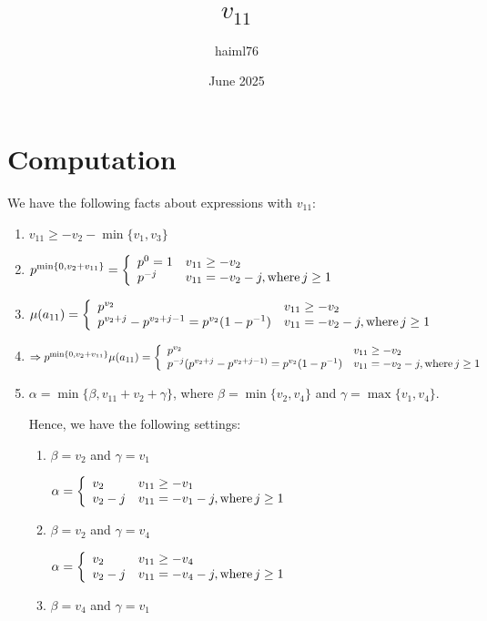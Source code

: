 \documentclass{article}
\title{$v_{11}$}
\author{haiml76 }
\date{June 2025}
\begin{document}
\maketitle

\section{Computation}
We have the following facts about expressions with $v_{11}$:
\begin{enumerate}
    \item 
$v_{11}\geq{-v_2-\min\{v_1,v_3\}}$
\item $p^{\min\{0,v_2+v_{11}\}}=\left\{
	\begin{array}{ll}
		p^{0}=1  & v_{11}\geq{-v_2} \\
		  p^{-j} & v_{11}=-v_2-j, \text{where\,}j\geq{1}
	\end{array}
\right.$
\item $\mu(a_{11})=\left\{
	\begin{array}{ll}
		p^{v_2}  & v_{11}\geq{-v_2} \\
		  p^{v_2+j}-p^{v_2+j-1}=p^{v_2}(1-p^{-1}) & v_{11}=-v_2-j, \text{where\,}j\geq{1}
	\end{array}
\right.$
\item $\Rightarrow{p^{\min\{0,v_2+v_{11}\}}\mu(a_{11})=\left\{
	\begin{array}{ll}
		p^{v_2}  & v_{11}\geq{-v_2} \\
		  p^{-j}(p^{v_2+j}-p^{v_2+j-1)}=p^{v_2}(1-p^{-1}) & v_{11}=-v_2-j, \text{where\,}j\geq{1}
	\end{array}
\right.}$
\item $\alpha=\min\{\beta,v_{11}+v_2+\gamma\}$, where $\beta=\min\{v_2,v_4\}$ and $\gamma=\max\{v_1,v_4\}$.

Hence, we have the following settings:
\begin{enumerate}
    \item $\beta=v_2$ and $\gamma=v_1$

$\alpha=\left\{
	\begin{array}{ll}
            v_2  & v_{11}\geq{-v_1} \\
		  v_2-j & v_{11}=-v_1-j, \text{where\,}j\geq{1}
	\end{array}
\right.$    
\item $\beta=v_2$ and $\gamma=v_4$

$\alpha=\left\{
	\begin{array}{ll}
            v_2  & v_{11}\geq{-v_4} \\
		  v_2-j & v_{11}=-v_4-j, \text{where\,}j\geq{1}
	\end{array}
\right.$    
\item $\beta=v_4$ and $\gamma=v_1$


\end{enumerate}
\end{enumerate}
\end{document}
